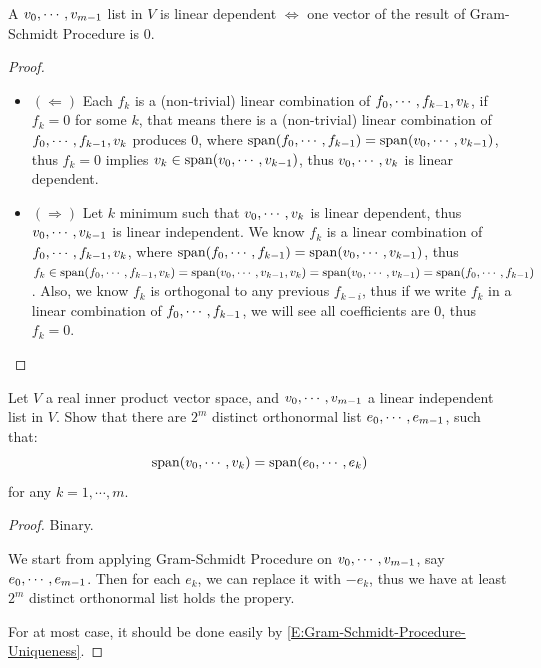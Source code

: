 \documentclass[../main.tex]{subfiles}
\begin{document}
\setcounter{exercise}{12}
\begin{exercise}
  A $v_0 , \cdots , v_{m - 1}$ list in $V$ is linear dependent $\iff$ one vector of the result of
  Gram-Schmidt Procedure is $0$.
\end{exercise}
\begin{proof}
  ~
  \begin{itemize}
    \item $(\Leftarrow)$ Each $f_k$ is a (non-trivial) linear combination of $f_0 , \cdots , f_{k - 1}, v_k$,
          if $f_k = 0$ for some $k$, that means there is a (non-trivial) linear combination of $f_0 , \cdots , f_{k - 1}, v_k$
          produces $0$, where $\operatorname{span}(f_0 , \cdots , f_{k - 1}) = \operatorname{span}(v_0 , \cdots , v_{k - 1})$, thus $f_k = 0$
          implies $v_k \in \operatorname{span}(v_0 , \cdots , v_{k - 1})$, thus $v_0 , \cdots , v_{k}$ is linear dependent.
    \item $(\Rightarrow)$ Let $k$ minimum such that $v_0 , \cdots , v_{k}$ is linear dependent,
          thus $v_0 , \cdots , v_{k - 1}$ is linear independent.
          We know $f_k$ is a linear combination of $f_0 , \cdots , f_{k - 1}, v_k$,
          where $\operatorname{span}(f_0 , \cdots , f_{k - 1}) = \operatorname{span}(v_0 , \cdots , v_{k - 1})$,
          thus $f_k \in \operatorname{span}(f_0 , \cdots , f_{k - 1}, v_k) = \operatorname{span}(v_0 , \cdots , v_{k - 1}, v_k) = \operatorname{span}(v_0 , \cdots , v_{k - 1}) = \operatorname{span}(f_0 , \cdots , f_{k - 1})$.
          Also, we know $f_k$ is orthogonal to any previous $f_{k - i}$, thus
          if we write $f_k$ in a linear combination of $f_0 , \cdots , f_{k - 1}$, we will see
          all coefficients are $0$, thus $f_k = 0$.
  \end{itemize}
\end{proof}

\begin{exercise}
  Let $V$ a real inner product vector space, and $v_0 , \cdots , v_{m - 1}$ a linear independent list in $V$.
  Show that there are $2^m$ distinct orthonormal list $e_0 , \cdots , e_{m - 1}$, such that:
  \[
  \operatorname{span}(v_0 , \cdots , v_{k}) = \operatorname{span}(e_0 , \cdots , e_{k})
  \]
  for any $k = 1, \cdots, m$.
\end{exercise}
\begin{proof}
  Binary.

  We start from applying Gram-Schmidt Procedure on $v_0 , \cdots , v_{m - 1}$, say $e_0 , \cdots , e_{m - 1}$.
  Then for each $e_k$, we can replace it with $- e_k$, thus we have at least
  $2^m$ distinct orthonormal list holds the propery.

  For at most case, it should be done easily by \ref{E:Gram-Schmidt-Procedure-Uniqueness}.
\end{proof}
\end{document}
